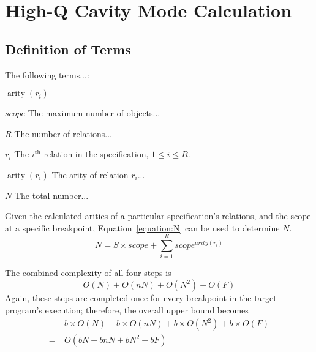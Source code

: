 \section{High-Q Cavity Mode Calculation}\label{sec:cavity}

\subsection{Definition of Terms}\label{sec:termDefn}

    The following terms...:

    \begin{Ventry}{\boldmath $\operatorname{arity}(r_i)$ \unboldmath}

        \boldmath \item[$scope$] \unboldmath
        The maximum number of objects...

        \boldmath \item[$R$] \unboldmath
        The number of relations...

        \boldmath \item[$r_i$] \unboldmath
        The $i^\text{th}$ relation in the specification, $1 \le i \le R$.

        \boldmath \item[$\operatorname{arity}(r_i)$] \unboldmath
        The arity of relation $r_i$...

        \boldmath \item[$N$] \unboldmath The total number...

        Given the calculated arities of a particular specification's relations, and the scope at
        a specific breakpoint, Equation~\ref{equation:N} can be used to determine $N$.
        \begin{equation}\label{equation:N}
        N = S \times scope + \sum_{i=1}^R scope ^ {arity(r_i)}
        \end{equation}

    \end{Ventry}



    The combined complexity of all four steps is
    \begin{equation*}
        O(N) + O(nN) + O(N^2) + O(F)
    \end{equation*}
    Again, these steps are completed once for every breakpoint in the target program's
    execution; therefore, the overall upper bound becomes
    \begin{equation*}
    \begin{split}
        & b \times O(N) + b \times O(nN) + b \times O(N^2) + b \times  O(F) \\
                   = ~ & O(bN + bnN + bN^2 + bF)
    \end{split}
    \end{equation*}


